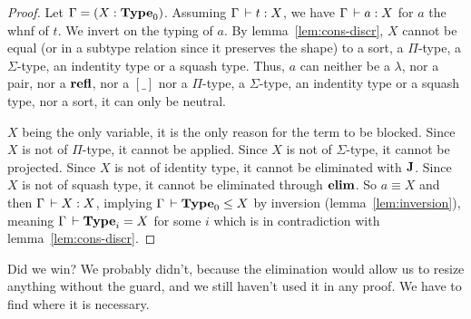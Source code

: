 \documentclass[a4paper,english]{lipics-utf8x}
\begin{document}
  \begin{proof}
    Let $\Gamma = (X : \operatorname{\mathbf{Type}}_0)$.
    Assuming $\Gamma \,\vdash t : X$, we have $\Gamma \,\vdash a : X$ for $a$ the whnf
    of $t$. We invert on the typing of $a$.
    By lemma~\ref{lem:cons-discr}, $X$ cannot be equal (or in a subtype
    relation since it preserves the shape) to a sort, a $\Pi$-type, a
    $\Sigma$-type, an indentity type or a squash type.
    Thus, $a$ can neither be a $\lambda$, nor a pair, nor a $\operatorname{\mathbf{refl}}$,
    nor a $[\_]$ nor a $\Pi$-type, a $\Sigma$-type, an indentity type or
    a squash type, nor a sort, it can only be neutral.

    $X$ being the only variable, it is the only reason for the term to be
    blocked.
    Since $X$ is not of $\Pi$-type, it cannot be applied.
    Since $X$ is not of $\Sigma$-type, it cannot be projected.
    Since $X$ is not of identity type, it cannot be eliminated with $\operatorname{\mathbf{J}}$.
    Since $X$ is not of squash type, it cannot be eliminated through $\operatorname{\mathbf{elim}}$.
    So $a \equiv X$ and then $\Gamma \,\vdash X : X$, implying
    $\Gamma \,\vdash \operatorname{\mathbf{Type}}_0 \le X$ by inversion
    (lemma~\ref{lem:inversion}), meaning $\Gamma \,\vdash \operatorname{\mathbf{Type}}_i = X$ for some
    $i$ which is in contradiction with lemma~\ref{lem:cons-discr}.
  \end{proof}

  \noindent %
  Did we win?
  We probably didn't, because the elimination would allow us to resize anything
  without the guard, and we still haven't used it in any proof. We have to
  find where it is necessary.
\end{document}

